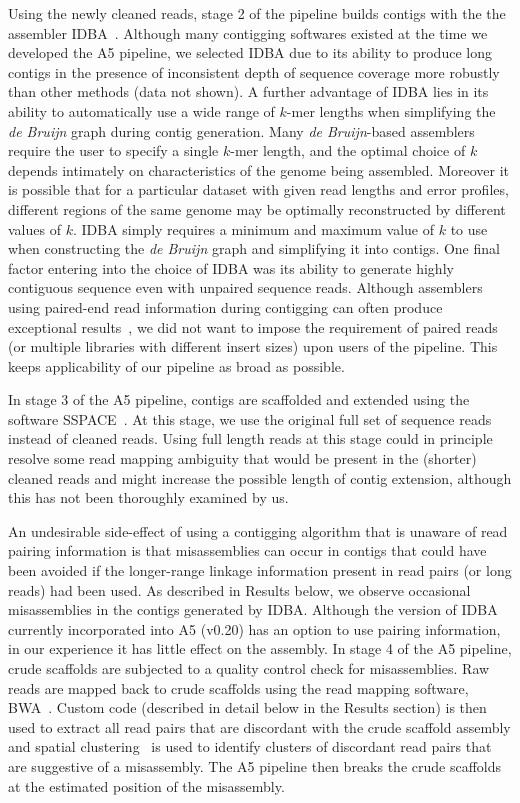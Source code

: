 \documentclass{bioinfo}
\begin{document}
\begin{methods}
Using the newly cleaned reads, stage 2 of the pipeline builds contigs
with the the assembler IDBA~\citep{Peng2010}. Although many contigging softwares existed at the time we developed the A5 pipeline, we selected IDBA due 
to its ability to produce long contigs in the presence of inconsistent depth of sequence coverage more robustly than other methods (data not shown).
A further advantage of IDBA lies in its ability to automatically use a wide range of $k$-mer lengths when simplifying the \emph{de Bruijn} graph during contig generation.
Many \emph{de Bruijn}-based assemblers require the user to specify a single $k$-mer length, and the optimal choice of $k$ depends intimately
on characteristics of the genome being assembled.  Moreover it is possible that for a particular dataset with given read lengths and error profiles, different regions of the same genome may be optimally reconstructed by different values of $k$. IDBA simply requires a minimum and maximum value of $k$ to
use when constructing the \emph{de Bruijn} graph and simplifying it into contigs. One final factor entering into the choice of IDBA was its ability to generate highly contiguous sequence even with unpaired sequence reads. Although assemblers using paired-end read information during contigging can often produce exceptional results~\citep{Gnerre2011, SASSY}, we did not want to impose the requirement of paired reads (or multiple libraries with different insert sizes) upon users of the pipeline. This keeps applicability of our pipeline as broad as possible.

In stage 3 of the A5 pipeline, contigs are scaffolded and extended using the software SSPACE~\citep{Boetzer2011}. At this stage, we use the original full set of sequence reads instead of cleaned reads. Using full length reads at this stage could in principle resolve some read mapping ambiguity that would be present in the (shorter) cleaned reads and might increase the possible length of contig extension, although this has not been thoroughly examined by us.

An undesirable side-effect of using a contigging algorithm that is unaware of read pairing information is that misassemblies can occur in contigs that could have been avoided if the longer-range linkage information present in read pairs (or long reads) had been used.  As described in Results below, we observe occasional misassemblies in the contigs generated by IDBA. Although the version of IDBA currently incorporated into A5 (v0.20) has an option to use pairing information, in our experience it has little effect on the assembly. In stage 4 of the A5 pipeline, crude scaffolds are subjected to a quality control check for misassemblies. Raw reads are mapped back to crude scaffolds using the read mapping software,
BWA~\citep{bwa}. Custom code (described in detail below in the Results section) is then used to extract all read pairs that are discordant with the crude scaffold assembly and spatial clustering~\citep{DBSCAN} is used to identify clusters of discordant read pairs that are suggestive of a misassembly. The A5 pipeline then breaks the crude scaffolds at the estimated position of the misassembly.


\end{methods}
\end{document}
